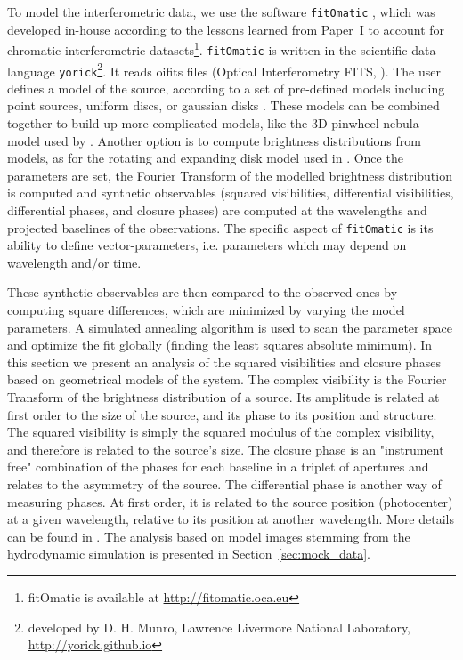 \documentclass[usenatbib]{mnras}%
\begin{document}
To model the interferometric data, we use the software \texttt{fitOmatic} \citep{2009A&A...507..317M}, which was developed in-house according to the lessons learned from Paper~I to account for chromatic interferometric datasets\footnote{fitOmatic is available at \url{http://fitomatic.oca.eu}}. \texttt{fitOmatic} is written in the scientific data language \texttt{yorick}\footnote{developed by  D. H. Munro, Lawrence Livermore National Laboratory, \url{http://yorick.github.io}}. It reads oifits  files (Optical Interferometry FITS,  \citet{2004SPIE.5491.1231P}). The user defines a model of the source, according to a set of pre-defined models including point sources, uniform discs, or gaussian disks \citep[as used in][]{Chesneau2014,Chiavassa2010, Millour2009a}. These models can be combined together to build up more complicated models, like the 3D-pinwheel nebula model used by \citet{Millour2009c}. Another option is to compute brightness distributions from models, as  for the rotating and expanding disk model used in \citet{Millour2011}. Once the parameters are set, the Fourier Transform of the modelled brightness distribution is computed and synthetic observables (squared visibilities, differential visibilities, differential phases, and closure phases) are computed at the wavelengths and projected baselines of the observations. The specific aspect of \texttt{fitOmatic} is its ability to define vector-parameters, i.e. parameters which may depend on wavelength and/or time.

These synthetic observables are then compared to the observed ones by computing square differences, which are minimized by varying the model parameters. A simulated annealing algorithm is used to scan the parameter space and optimize the fit globally (finding the least squares absolute minimum). In this section we present an analysis of the squared visibilities and closure phases based on geometrical models of the system. The complex visibility is the Fourier Transform of the brightness  distribution of a source. Its amplitude is related at first order to the size of the source, and its phase to its position and structure. The squared visibility is simply the squared modulus of the complex visibility, and therefore is related to the source's size. The closure phase is an "instrument free" combination of the phases for each baseline in a triplet of apertures  and relates to the asymmetry of the source. The differential phase is another way of measuring phases. At first order, it is related to the source position (photocenter) at a given wavelength, relative to its position at another wavelength. More details can be found in \citet{2003A&A...400..795L}. The analysis based on model images stemming from the hydrodynamic simulation is presented in Section~\ref{sec:mock_data}. 
\end{document}
